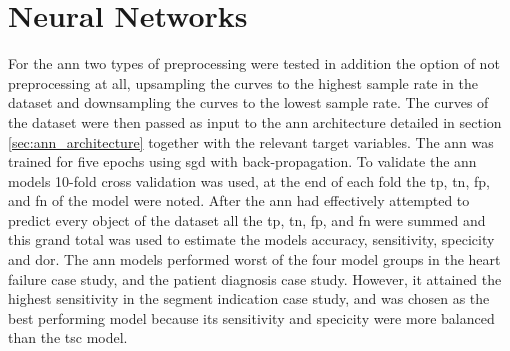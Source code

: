 \section{Neural Networks}
For the \acrshort{ann} two types of preprocessing were tested in addition the option of not preprocessing at all, upsampling the curves to the highest sample rate in the dataset and downsampling the curves to the lowest sample rate. The curves of the dataset were then passed as input to the \acrshort{ann} architecture detailed in section \ref{sec:ann_architecture} together with the relevant target variables. The \acrshort{ann} was trained for five epochs using \acrshort{sgd} with back-propagation. To validate the \acrshort{ann} models 10-fold cross validation was used, at the end of each fold the \acrshort{tp}, \acrshort{tn}, \acrshort{fp}, and \acrshort{fn} of the model were noted. After the \acrshort{ann} had effectively attempted to predict every object of the dataset all the \acrshort{tp}, \acrshort{tn}, \acrshort{fp}, and \acrshort{fn} were summed and this grand total was used to estimate the models accuracy, sensitivity, specicity and \acrshort{dor}. \bigskip
The \acrshort{ann} models performed worst of the four model groups in the heart failure case study, and the patient diagnosis case study. However, it attained the highest sensitivity in the segment indication case study, and was chosen as the best performing model because its sensitivity and specicity were more balanced than the \acrshort{tsc} model.

